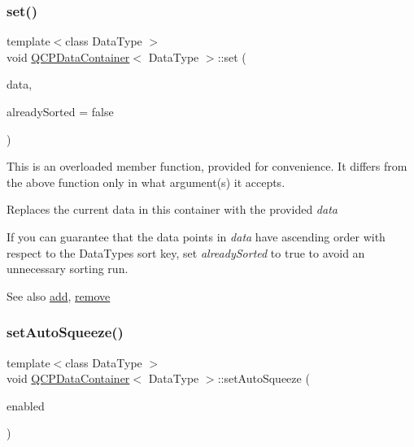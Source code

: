 \subsubsection{\texorpdfstring{set()}{set()}\hspace{0.1cm}{\footnotesize\ttfamily [2/2]}}
{\footnotesize\ttfamily template$<$class Data\+Type $>$ \\
void \hyperlink{class_q_c_p_data_container}{Q\+C\+P\+Data\+Container}$<$ Data\+Type $>$\+::set (\begin{DoxyParamCaption}\item[{const Q\+Vector$<$ Data\+Type $>$ \&}]{data,  }\item[{bool}]{already\+Sorted = {\ttfamily false} }\end{DoxyParamCaption})}

This is an overloaded member function, provided for convenience. It differs from the above function only in what argument(s) it accepts.

Replaces the current data in this container with the provided {\itshape data} 

If you can guarantee that the data points in {\itshape data} have ascending order with respect to the Data\+Type\textquotesingle{}s sort key, set {\itshape already\+Sorted} to true to avoid an unnecessary sorting run.

\begin{DoxySeeAlso}{See also}
\hyperlink{class_q_c_p_data_container_a42b98bd994307ccd163a43d576f91ad9}{add}, \hyperlink{class_q_c_p_data_container_ae5f569a120648b167efa78835f12fd38}{remove} 
\end{DoxySeeAlso}
\mbox{\label{class_q_c_p_data_container_a233f866760a78950d2a393c1a4bc54b5}} 
\subsubsection{\texorpdfstring{set\+Auto\+Squeeze()}{setAutoSqueeze()}}
{\footnotesize\ttfamily template$<$class Data\+Type $>$ \\
void \hyperlink{class_q_c_p_data_container}{Q\+C\+P\+Data\+Container}$<$ Data\+Type $>$\+::set\+Auto\+Squeeze (\begin{DoxyParamCaption}\item[{bool}]{enabled }\end{DoxyParamCaption})}

